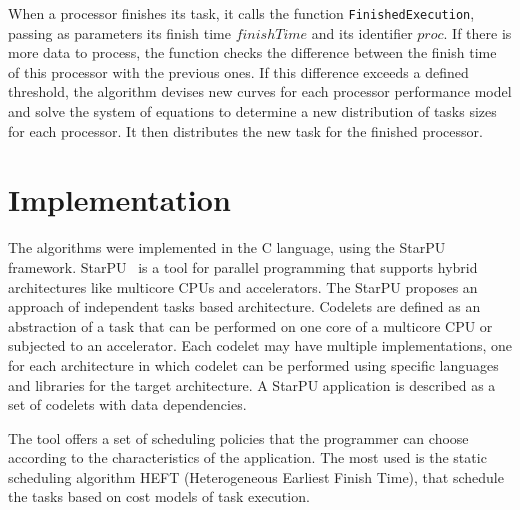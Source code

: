\documentclass[journal]{IEEEtran}
\begin{document}


When a processor finishes its task, it calls the function \texttt{FinishedExecution}, passing as parameters its finish time $finishTime$ and its identifier $proc$. If there is more data to process, the function checks the difference between the finish time of this processor with the previous ones. If this difference exceeds a defined threshold, the algorithm devises new curves for each processor performance model and solve the system of equations to determine a new distribution of tasks sizes for each processor. It then distributes the new task for the finished processor.


\section{Implementation}

The algorithms were implemented in the C language, using the StarPU framework.
StarPU~\cite{starpu} is a tool for parallel programming that supports hybrid
architectures like multicore CPUs and accelerators. The StarPU proposes an
approach of independent tasks based architecture. Codelets are defined as an
abstraction of a task that can be performed on one core of a multicore CPU or
subjected to an accelerator. Each codelet may have multiple implementations, one
for each architecture in which codelet can be performed using specific languages
and libraries for the target architecture. A StarPU application is described as
a set of codelets with data dependencies.

The tool offers a set of scheduling policies that the programmer can
choose according to the characteristics of the application. The most used is the static scheduling algorithm HEFT (Heterogeneous Earliest Finish Time), that
schedule the tasks based on cost models of task execution.
\end{document}
